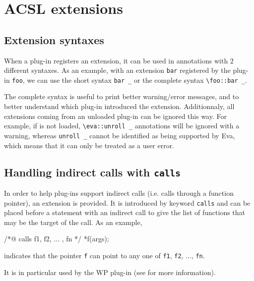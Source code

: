 \chapter{ACSL extensions} %
\label{cha:acsl-extensions}
\section{Extension syntaxes}
\label{acsl:syntax}

When a plug-in registers an extension, it can be used in \acsl annotations
with 2 different syntaxes. As an example, with an extension \lstinline|bar|
registered by the plug-in \lstinline|foo|, we can use the short syntax
\lstinline|bar _| or the complete syntax \lstinline|\foo::bar _|.

The complete syntax is useful to print better warning/error messages, and to
better understand which plug-in introduced the extension. Additionnaly, all
extensions coming from an unloaded plug-in can be ignored this way. For
example, if \Eva is not loaded, \lstinline|\eva::unroll _| annotations will be
ignored with a warning, whereas \lstinline|unroll _| cannot be identified as
being supported by Eva, which means that it can only be treated as a user
error. 

\section{Handling indirect calls with \texttt{calls}}
\label{acsl:calls}

In order to help plug-ins support indirect calls (i.e. calls through
a function pointer), an \acsl extension is provided. It is introduced
by keyword \lstinline|calls| and can be placed before
a statement with an indirect call to give the list of
functions that may be the target of the call. As an example,
\begin{ccode}
/*@ calls f1, f2, ... , fn */
*f(args);
\end{ccode}
indicates that the pointer \lstinline|f| can point to any one of
\lstinline|f1|, \lstinline|f2|, ..., \lstinline|fn|.

It is in particular used by the WP plug-in (see \cite{wp} for more information).

